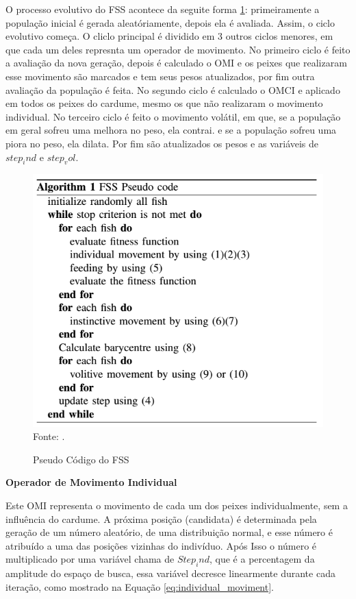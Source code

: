 O processo evolutivo do FSS acontece da seguite forma \ref{fig:pseudo_code}: primeiramente a população inicial é gerada aleatóriamente, depois ela é avaliada. Assim, o ciclo evolutivo começa. O cliclo principal é dividido em 3 outros ciclos menores, em que cada um deles represnta um operador de movimento. No primeiro ciclo é feito a avaliação da nova geração, depois é calculado o OMI e os peixes que realizaram esse movimento são marcados e tem seus pesos atualizados, por fim outra avaliação da população é feita. No segundo ciclo é calculado o OMCI e aplicado em todos os peixes do cardume, mesmo os que não realizaram o movimento individual. No terceiro ciclo é feito o movimento volátil, em que, se a população em geral sofreu uma melhora no peso, ela contrai. e se a população sofreu uma piora no peso, ela dilata. Por fim são atualizados os pesos e as variáveis de $step_ind$ e $step_vol$.

\begin{figure}[!htb]
	\caption{Pseudo Código do FSS}
	\centering
	\includegraphics[scale=0.5]{images/pseudo_codigo.png}
	\label{fig:pseudo_code}{\\Fonte: .}
\end{figure}

\noindent \textbf{Operador de Movimento Individual}

Este OMI representa o movimento de cada um dos peixes individualmente, sem a influência do cardume. A próxima posição (candidata) é determinada pela geração de um número aleatório, de uma distribuição normal, e esse número é atribuído a uma das posições vizinhas do indivíduo. Após Isso o número é multiplicado por uma variável chama de $Step_ind$, que é a percentagem da amplitude do espaço de busca, essa variável decresce linearmente durante cada iteração, como mostrado na Equação \ref{eq:individual_moviment}.

